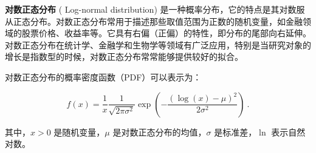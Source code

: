 
\textbf{对数正态分布} (
Log-normal distribution) 是一种概率分布，它的特点是其对数服从正态分布。对数正态分布常用于描述那些取值范围为正数的随机变量，如金融领域的股票价格、收益率等。它具有右偏（正偏）的特性，即分布的尾部向右延伸。对数正态分布在统计学、金融学和生物学等领域有广泛应用，特别是当研究对象的增长是指数型的时候，对数正态分布常常能够提供较好的拟合。

对数正态分布的概率密度函数（PDF）可以表示为：

\begin{equation}
f(x) = \frac{1}{x} \frac{1}{\sqrt{2 \pi \sigma^2}} \exp \left(-\frac{(\log (x)-\mu)^2}{2 \sigma^2}\right)~.
\end{equation}

其中，\( x > 0 \) 是随机变量，\( \mu \) 是对数正态分布的均值，\( \sigma \) 是标准差，\( \ln \) 表示自然对数。

